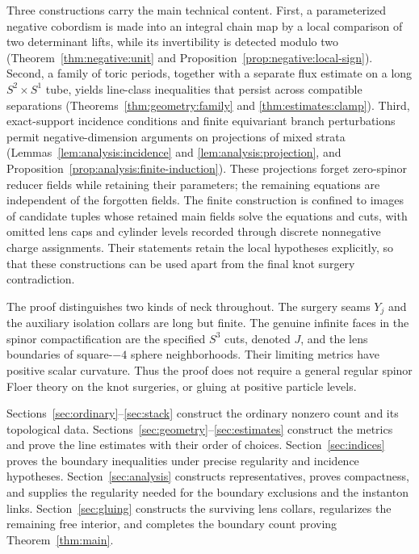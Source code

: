 Three constructions carry the main technical content. First, a
parameterized negative cobordism is made into an integral chain map by a
local comparison of two determinant lifts, while its invertibility is
detected modulo two (Theorem~\ref{thm:negative:unit} and
Proposition~\ref{prop:negative:local-sign}). Second, a family of toric periods, together with a
separate flux estimate on a long $S^2\times S^1$ tube, yields line-class
inequalities that persist across compatible separations
(Theorems~\ref{thm:geometry:family} and \ref{thm:estimates:clamp}). Third,
exact-support incidence conditions and finite equivariant branch
perturbations permit negative-dimension arguments on projections of
mixed strata (Lemmas~\ref{lem:analysis:incidence} and
\ref{lem:analysis:projection}, and Proposition~\ref{prop:analysis:finite-induction}).
These projections forget zero-spinor reducer fields while retaining
their parameters; the remaining equations are independent of the
forgotten fields. The finite construction is confined to images of
candidate tuples whose retained main fields solve the equations and
cuts, with omitted lens caps and cylinder levels recorded through discrete
nonnegative charge assignments.
Their statements retain the local hypotheses explicitly,
so that these constructions can be used apart from the final knot
surgery contradiction.

The proof distinguishes two kinds of neck throughout. The surgery
seams $Y_j$ and the auxiliary isolation collars are long but finite.
The genuine infinite faces in the spinor compactification are the
specified $S^3$ cuts, denoted $J$, and the lens boundaries of
square-$-4$ sphere neighborhoods. Their limiting metrics have positive
scalar curvature. Thus the proof does not require a general regular
spinor Floer theory on the knot surgeries, or gluing at positive particle
levels.

Sections~\ref{sec:ordinary}--\ref{sec:stack} construct the ordinary
nonzero count and its topological data.
Sections~\ref{sec:geometry}--\ref{sec:estimates} construct the metrics and
prove the line estimates with their order of choices.
Section~\ref{sec:indices} proves the boundary inequalities under precise
regularity and incidence hypotheses.
Section~\ref{sec:analysis} constructs representatives, proves compactness,
and supplies the regularity needed for the boundary exclusions and the
instanton links. Section~\ref{sec:gluing} constructs the surviving lens
collars, regularizes the remaining free interior, and completes the
boundary count proving Theorem~\ref{thm:main}.
